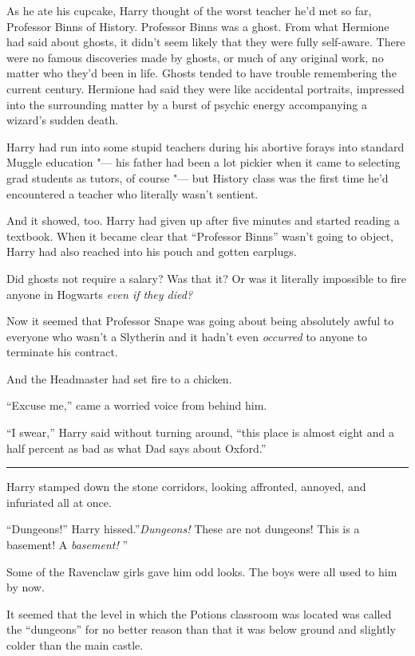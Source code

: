 As he ate his cupcake, Harry thought of the worst teacher he'd met so
far, Professor Binns of History. Professor Binns was a ghost. From what
Hermione had said about ghosts, it didn't seem likely that they were
fully self-aware. There were no famous discoveries made by ghosts, or
much of any original work, no matter who they'd been in life. Ghosts
tended to have trouble remembering the current century. Hermione had
said they were like accidental portraits, impressed into the surrounding
matter by a burst of psychic energy accompanying a wizard's sudden
death.

Harry had run into some stupid teachers during his abortive forays into
standard Muggle education "--- his father had been a lot pickier when it
came to selecting grad students as tutors, of course "--- but History class
was the first time he'd encountered a teacher who literally wasn't
sentient.

And it showed, too. Harry had given up after five minutes and started
reading a textbook. When it became clear that ``Professor Binns'' wasn't
going to object, Harry had also reached into his pouch and gotten
earplugs.

Did ghosts not require a salary? Was that it? Or was it literally
impossible to fire anyone in Hogwarts \emph{even if they died?}

Now it seemed that Professor Snape was going about being absolutely
awful to everyone who wasn't a Slytherin and it hadn't even
\emph{occurred} to anyone to terminate his contract.

And the Headmaster had set fire to a chicken.

``Excuse me,'' came a worried voice from behind him.

``I swear,'' Harry said without turning around, ``this place is almost
eight and a half percent as bad as what Dad says about Oxford.''

\begin{center}\rule{3in}{0.4pt}\end{center}

Harry stamped down the stone corridors, looking affronted, annoyed, and
infuriated all at once.

``Dungeons!'' Harry hissed.''\emph{Dungeons!} These are not dungeons!
This is a basement! A \emph{basement!} ''

Some of the Ravenclaw girls gave him odd looks. The boys were all used
to him by now.

It seemed that the level in which the Potions classroom was located was
called the ``dungeons'' for no better reason than that it was below
ground and slightly colder than the main castle.

